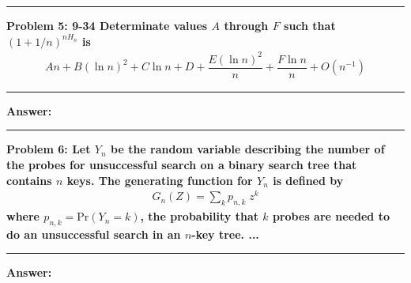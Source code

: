 \documentclass[11pt,fleqn]{article}
\newcommand\question[2]{\vspace{.25in}\hrule\textbf{#1: #2}\vspace{.5em}\hrule\vspace{.10in}}
\renewcommand\part[1]{\vspace{.10in}\textbf{#1}}
\begin{document}
\question{Problem 5} {9-34 Determinate values $A$ through $F$ such that $(1+1/n)^{n H_n}$ 
	is
	\begin{align*}
		An + B(\ln n)^2 + C \ln n + D + \dfrac{E(\ln n)^2}{n} + \dfrac{F \ln n}{n} + O(n^{-1})
	\end{align*}
}

\part{Answer:}

\question{Problem 6} {Let $Y_n$ be the random variable describing the number of the probes
	for unsuccessful search on a binary search tree that contains $n$ keys.
	The generating function for $Y_n$ is defined by
	\begin{align*}
		G_{n}(Z) = \sum_{k} p_{n,k} \; z^k
	\end{align*}
	where $p_{n,k} = \text{Pr}(Y_n = k)$, the probability that $k$ probes are needed to 
	do an unsuccessful search in an $n$-key tree. ...
}

\part{Answer:}
\end{document}
